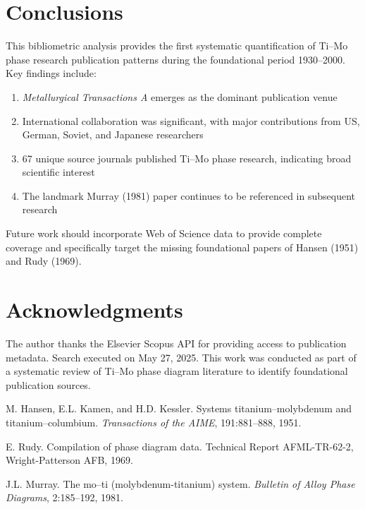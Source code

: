 \documentclass[11pt,a4paper]{article}
\begin{document}
\section{Conclusions}

This bibliometric analysis provides the first systematic quantification of Ti--Mo phase research publication patterns during the foundational period 1930--2000. Key findings include:

\begin{enumerate}
    \item \textit{Metallurgical Transactions A} emerges as the dominant publication venue
    \item International collaboration was significant, with major contributions from US, German, Soviet, and Japanese researchers
    \item 67 unique source journals published Ti--Mo phase research, indicating broad scientific interest
    \item The landmark Murray (1981) paper continues to be referenced in subsequent research
\end{enumerate}

Future work should incorporate Web of Science data to provide complete coverage and specifically target the missing foundational papers of Hansen (1951) and Rudy (1969).

\section*{Acknowledgments}

The author thanks the Elsevier Scopus API for providing access to publication metadata. Search executed on May 27, 2025. This work was conducted as part of a systematic review of Ti--Mo phase diagram literature to identify foundational publication sources.



\begin{thebibliography}{3}

M. Hansen, E.L. Kamen, and H.D. Kessler.
\newblock Systems titanium--molybdenum and titanium--columbium.
\newblock \textit{Transactions of the AIME}, 191:881--888, 1951.

E. Rudy.
\newblock Compilation of phase diagram data.
\newblock Technical Report AFML-TR-62-2, Wright-Patterson AFB, 1969.

J.L. Murray.
\newblock The mo--ti (molybdenum-titanium) system.
\newblock \textit{Bulletin of Alloy Phase Diagrams}, 2:185--192, 1981.

\end{thebibliography}
\end{document}
